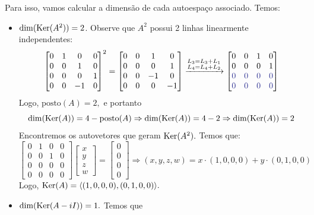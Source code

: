 \documentclass[11pt,a4paper]{article}
\begin{document}
{Para isso, vamos calcular a dimensão de cada autoespaço associado. Temos:
\begin{itemize}
    \item $\dim(\operatorname{Ker}(A^2)) =2$. Observe que $A^2$ possui 2 linhas linearmente independentes:
    \[ \begin{bmatrix}
0 & 1 & 0& 0\\
0 &0 &1 & 0 \\
0 &0 &0& 1 \\
0 & 0 & -1&0
\end{bmatrix}^2 = \begin{bmatrix}
0 & 0 & 1& 0\\
0 &0 &0 & 1 \\
0 &0 &-1& 0 \\
0 & 0 & 0&-1
\end{bmatrix}  \xrightarrow[]{\substack{L_3 = L_3 +L_1 \\L_4 = L_4 +L_2}}  \begin{bmatrix}
0 & 0 & 1& 0\\
0 &0 &0 & 1 \\
\textcolor{Blue}{0} & \textcolor{Blue}{0} & \textcolor{Blue}{0}&\textcolor{Blue}{0}\\
\textcolor{Blue}{0} & \textcolor{Blue}{0} & \textcolor{Blue}{0}&\textcolor{Blue}{0}
\end{bmatrix} 
    \]
    Logo, $\mbox{posto}(A) = 2,$ e portanto 
    \[\dim(\operatorname{Ker}(A)) = 4 - \mbox{posto}(A)  \Rightarrow \dim(\operatorname{Ker}(A)) = 4 - 2 \Rightarrow \dim(\operatorname{Ker}(A)) = 2
    \]
Encontremos os autovetores que geram $\operatorname{Ker}(A^2).$ Temos que:
\[
\begin{bmatrix}
0 & 1 & 0& 0\\
0 &0 &1 & 0 \\
0 &0 &0& 0 \\
0 & 0 & 0 & 0
\end{bmatrix} \begin{bmatrix} x \\ y \\ z \\w  \end{bmatrix} = \begin{bmatrix} 0 \\ 0 \\ 0 \\0  \end{bmatrix} \Rightarrow (x,y,z,w) = x \cdot (1,0,0,0) + y \cdot (0,1,0,0)
\]
Logo, $\operatorname{Ker}(A) = \langle (1,0,0,0), (0,1,0,0) \rangle.$
    \item $\dim(\operatorname{Ker}(A - iI)) = 1.$ Temos que

\end{itemize}}
\end{document}
